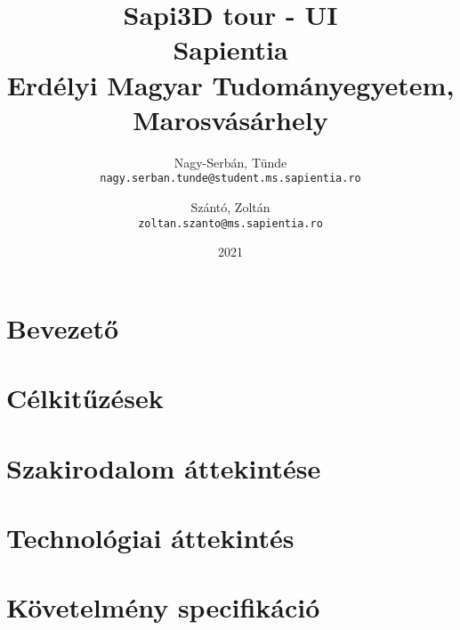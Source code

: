 \documentclass[12pt]{report}
\title{
	{Sapi3D tour - UI}\\
	{\large Sapientia\\
	Erdélyi Magyar Tudományegyetem, Marosvásárhely}
}
\author{
	Nagy-Serbán, Tünde\\
	\texttt{nagy.serban.tunde@student.ms.sapientia.ro}
	\and
	Szántó, Zoltán\\
	\texttt{zoltan.szanto@ms.sapientia.ro}	
}
\date{2021}
\begin{document}
%


%

%

%


%


\tableofcontents

\listoffigures

\listoftables

\chapter{Bevezető}


\chapter{Célkitűzések}


\chapter{Szakirodalom áttekintése}


\chapter{Technológiai áttekintés}



\chapter{Követelmény specifikáció}


\end{document}
